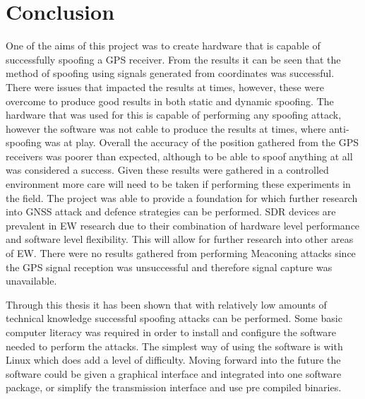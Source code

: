 
\chapter{Conclusion} %

\label{Chapter7} %

One of the aims of this project was to create hardware that is capable of successfully spoofing a GPS receiver. From the results it can be seen that the method of
spoofing using signals generated from coordinates was successful. There were issues that impacted the results at times, however, these were overcome to produce good
results in both static and dynamic spoofing. The hardware that was used for this is capable of performing any spoofing attack, however the
software was not cable to produce the results at times, where anti-spoofing was at play.
Overall the accuracy of the position gathered from the GPS receivers was poorer than expected, although
to be able to spoof anything at all was considered a success. Given these results were gathered in a controlled environment more care will need to be taken if
performing these experiments in the field. The project was able to provide a foundation for which further research into GNSS attack and defence strategies can be
performed. SDR devices are prevalent in EW research due to their combination of hardware level performance and software level flexibility. This will allow for further
research into other areas of EW.
There were no results gathered from performing Meaconing attacks since the GPS signal reception was unsuccessful and therefore signal capture was unavailable.

Through this thesis it has been shown that with relatively low amounts of technical knowledge successful spoofing attacks can be performed. Some basic computer literacy
was required in order to install and configure the software needed to perform the attacks. The simplest way of using the software is with Linux which does add a level of
difficulty.
Moving forward into the future the software could be given a graphical interface and integrated into one software package, or simplify the transmission interface and use
pre compiled binaries.